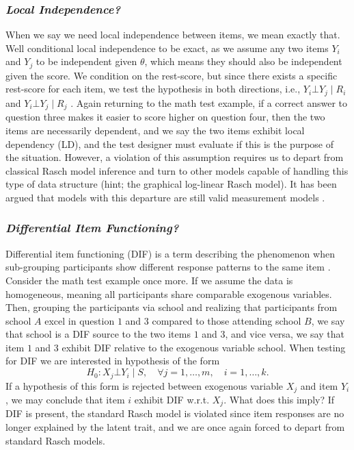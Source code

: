 \documentclass[a4project,12pt]{article}
\theoremstyle{examplestyle}
\theoremstyle{defstyle}
\theoremstyle{thmstyle}
\begin{document}
\subsubsection{\textit{Local Independence?}}

When we say we need local independence between items, we mean exactly that. Well conditional local independence to be exact, as we assume any two items $Y_i$ and $Y_j$ to be independent given $\theta$, which means they should also be independent given the score. We condition on the rest-score, but since there exists a specific rest-score for each item, we test the hypothesis in both directions, i.e., $Y_i \bot Y_j \mid R_i$ and $Y_i \bot Y_j \mid R_j$ \cite{kreiner-christensen-2012}. Again returning to the math test example, if a correct answer to question three makes it easier to score higher on question four, then the two items are necessarily dependent, and we say the two items exhibit local dependency (LD), and the test designer must evaluate if this is the purpose of the situation. However, a violation of this assumption requires us to depart from classical Rasch model inference and turn to other models capable of handling this type of data structure (hint; the graphical log-linear Rasch model). It has been argued that models with this departure are still valid measurement models \cite{kreiner-2007}.


\subsubsection{\textit{Differential Item Functioning?}}
Differential item functioning (DIF) is a term describing the phenomenon when sub-grouping participants show different response patterns to the same item \cite{holland-wainer-2012}. Consider the math test example once more. If we assume the data is homogeneous, meaning all participants share comparable exogenous variables. Then, grouping the participants via school and realizing that participants from school $A$ excel in question $1$ and $3$ compared to those attending school $B$, we say that school is a DIF source to the two items $1$ and $3$, and vice versa, we say that item $1$ and $3$ exhibit DIF relative to the exogenous variable school. When testing for DIF we are interested in hypothesis of the form 
\begin{equation}
    H_0: X_j \bot Y_i \mid S, \quad \forall j=1,\dots,m,\quad i=1,\dots,k.
\end{equation}
If a hypothesis of this form is rejected between exogenous variable $X_j$ and item $Y_i$, we may conclude that item $i$ exhibit DIF w.r.t. $X_j$. What does this imply? If DIF is present, the standard Rasch model is violated since item responses are no longer explained by the latent trait, and we are once again forced to depart from standard Rasch models. 
\end{document}
